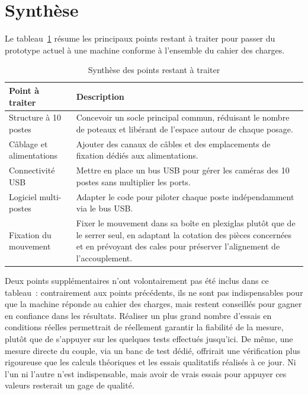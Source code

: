 \section{Synthèse}

Le tableau~\ref{tab:synthese_ameliorations} résume les principaux points
restant à traiter pour passer du prototype actuel à une machine conforme à
l'ensemble du cahier des charges.

\begin{table}[H]
  \centering
  \caption{Synthèse des points restant à traiter}
  \label{tab:synthese_ameliorations}
  \begin{tabular}{|p{4cm}|p{10.5cm}|}
    \hline
    \textbf{Point à traiter} & \textbf{Description} \\
    \hline
    Structure à 10 postes & Concevoir un socle principal commun, réduisant le
    nombre de poteaux et libérant de l'espace autour de chaque posage. \\
    \hline
    Câblage et alimentations & Ajouter des canaux de câbles et des
    emplacements de fixation dédiés aux alimentations. \\
    \hline
    Connectivité USB & Mettre en place un bus USB pour gérer les caméras des
    10 postes sans multiplier les ports. \\
    \hline
    Logiciel multi-postes & Adapter le code pour piloter chaque poste
    indépendamment via le bus USB. \\
    \hline
    Fixation du mouvement & Fixer le mouvement dans sa boîte en plexiglas
    plutôt que de le serrer seul, en adaptant la cotation des pièces
    concernées et en prévoyant des cales pour préserver l'alignement de
    l'accouplement. \\
    \hline
  \end{tabular}
\end{table}

Deux points supplémentaires n'ont volontairement pas été inclus dans ce
tableau~: contrairement aux points précédents, ils ne sont pas indispensables
pour que la machine réponde au cahier des charges, mais restent conseillés
pour gagner en confiance dans les résultats. Réaliser un plus grand nombre
d'essais en conditions réelles permettrait de réellement garantir la
fiabilité de la mesure, plutôt que de s'appuyer sur les quelques tests
effectués jusqu'ici. De même, une mesure directe du couple, via un banc de
test dédié, offrirait une vérification plus rigoureuse que les calculs
théoriques et les essais qualitatifs réalisés à ce jour. Ni l'un ni l'autre
n'est indispensable, mais avoir de vrais essais pour appuyer ces valeurs
resterait un gage de qualité.

